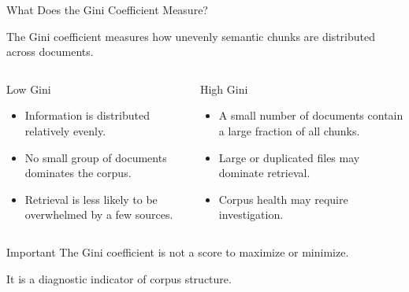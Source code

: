 \documentclass[aspectratio=169]{beamer}
\begin{document}
\begin{frame}{What Does the Gini Coefficient Measure?}

The Gini coefficient measures how unevenly semantic chunks are
distributed across documents.

\vspace{0.5cm}

\begin{columns}[T]


\begin{block}{Low Gini}

\begin{itemize}
\item Information is distributed relatively evenly.
\item No small group of documents dominates the corpus.
\item Retrieval is less likely to be overwhelmed by a few sources.
\end{itemize}

\end{block}


\begin{block}{High Gini}

\begin{itemize}
\item A small number of documents contain a large fraction of all chunks.
\item Large or duplicated files may dominate retrieval.
\item Corpus health may require investigation.
\end{itemize}

\end{block}

\end{columns}

\vspace{0.5cm}

\begin{alertblock}{Important}
The Gini coefficient is not a score to maximize or minimize.

It is a diagnostic indicator of corpus structure.
\end{alertblock}

\end{frame}

\end{document}
